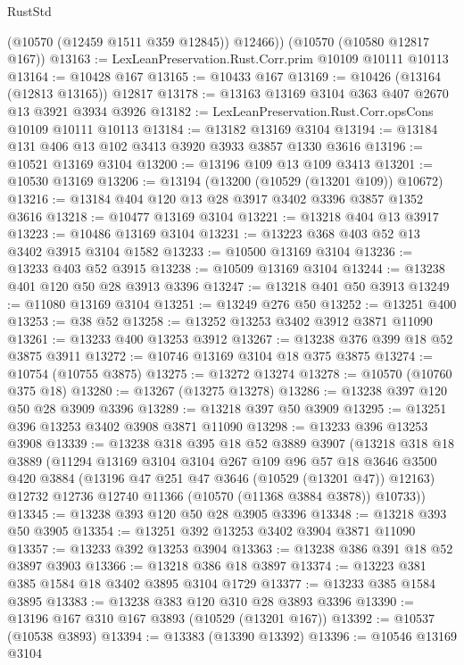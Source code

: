 \begin{lexlean}{RustStd}
\begin{coremodule}
        (@10570 (@12459 @1511 @359 @12845))
        @12466))
    (@10570 (@10580 @12817 @167))
@13163 := LexLeanPreservation.Rust.Corr.prim @10109 @10111 @10113
@13164 := @10428 @167
@13165 := @10433 @167
@13169 := @10426 (@13164 (@12813 @13165)) @12817
@13178 := @13163 @13169 @3104 @363 @407 @2670 @13 @3921 @3934 @3926
@13182 := LexLeanPreservation.Rust.Corr.opsCons @10109 @10111 @10113
@13184 := @13182 @13169 @3104
@13194 := @13184 @131 @406 @13 @102 @3413 @3920 @3933 @3857 @1330 @3616
@13196 := @10521 @13169 @3104
@13200 := @13196 @109 @13 @109 @3413
@13201 := @10530 @13169
@13206 := @13194 (@13200 (@10529 (@13201 @109)) @10672)
@13216 := @13184 @404 @120 @13 @28 @3917 @3402 @3396 @3857 @1352 @3616
@13218 := @10477 @13169 @3104
@13221 := @13218 @404 @13 @3917
@13223 := @10486 @13169 @3104
@13231 := @13223 @368 @403 @52 @13 @3402 @3915 @3104 @1582
@13233 := @10500 @13169 @3104
@13236 := @13233 @403 @52 @3915
@13238 := @10509 @13169 @3104
@13244 := @13238 @401 @120 @50 @28 @3913 @3396
@13247 := @13218 @401 @50 @3913
@13249 := @11080 @13169 @3104
@13251 := @13249 @276 @50
@13252 := @13251 @400
@13253 := @38 @52
@13258 := @13252 @13253 @3402 @3912 @3871 @11090
@13261 := @13233 @400 @13253 @3912
@13267 := @13238 @376 @399 @18 @52 @3875 @3911
@13272 := @10746 @13169 @3104 @18 @375 @3875
@13274 := @10754 (@10755 @3875)
@13275 := @13272 @13274
@13278 := @10570 (@10760 @375 @18)
@13280 := @13267 (@13275 @13278)
@13286 := @13238 @397 @120 @50 @28 @3909 @3396
@13289 := @13218 @397 @50 @3909
@13295 := @13251 @396 @13253 @3402 @3908 @3871 @11090
@13298 := @13233 @396 @13253 @3908
@13339 := @13238
    @318
    @395
    @18
    @52
    @3889
    @3907
    (@13218
      @318
      @18
      @3889
      (@11294
        @13169
        @3104
        @3104
        @267
        @109
        @96
        @57
        @18
        @3646
        @3500
        @420
        @3884
        (@13196 @47 @251 @47 @3646 (@10529 (@13201 @47)) @12163)
        @12732
        @12736
        @12740
        @11366
        (@10570 (@11368 @3884 @3878))
        @10733))
@13345 := @13238 @393 @120 @50 @28 @3905 @3396
@13348 := @13218 @393 @50 @3905
@13354 := @13251 @392 @13253 @3402 @3904 @3871 @11090
@13357 := @13233 @392 @13253 @3904
@13363 := @13238 @386 @391 @18 @52 @3897 @3903
@13366 := @13218 @386 @18 @3897
@13374 := @13223 @381 @385 @1584 @18 @3402 @3895 @3104 @1729
@13377 := @13233 @385 @1584 @3895
@13383 := @13238 @383 @120 @310 @28 @3893 @3396
@13390 := @13196 @167 @310 @167 @3893 (@10529 (@13201 @167))
@13392 := @10537 (@10538 @3893)
@13394 := @13383 (@13390 @13392)
@13396 := @10546 @13169 @3104

\end{coremodule}
\end{lexlean}
